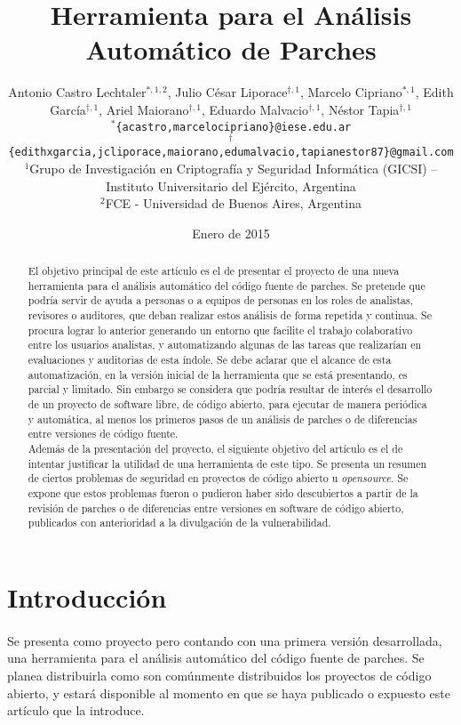 \documentclass[11pt,a4paper]{article}
\title{Herramienta para el Análisis\\Automático de Parches}
\author{
	Antonio Castro Lechtaler$^{\ast,1,2}$, Julio César Liporace$^{\dagger,1}$, Marcelo Cipriano$^{\ast,1}$, Edith García$^{\dagger,1}$, Ariel Maiorano$^{\dagger,1}$, Eduardo Malvacio$^{\dagger,1}$, Néstor Tapia$^{\dagger,1}$
	\\
	\vspace{2mm}
	\texttt{$^{\ast}$\{acastro,marcelocipriano\}@iese.edu.ar}
	\\
	\texttt{$^{\dagger}$\{edithxgarcia,jcliporace,maiorano,edumalvacio,tapianestor87\}@gmail.com}
	\\
	\vspace{5mm}
	$^1$Grupo de Investigación en Criptografía y Seguridad Informática (GICSI) – Instituto Universitario del Ejército, Argentina
	\\
	$^2$FCE - Universidad de Buenos Aires, Argentina
}
\date{Enero de 2015}
\begin{document}
\maketitle

\begin{abstract}
El objetivo principal de este artículo es el de presentar el proyecto de una nueva herramienta para el análisis automático del código fuente de parches. Se pretende que podría servir de ayuda a personas o a equipos de personas en los roles de analistas, revisores o auditores, que deban realizar estos análisis de forma repetida y continua. Se procura lograr lo anterior generando un entorno que facilite el trabajo colaborativo entre los usuarios analistas, y automatizando algunas de las tareas que realizarían en evaluaciones y auditorias de esta índole. Se debe aclarar que el alcance de esta automatización, en la versión inicial de la herramienta que se está presentando, es parcial y limitado. Sin embargo se considera que podría resultar de interés el desarrollo de un proyecto de software libre, de código abierto, para ejecutar de manera periódica y automática, al menos los primeros pasos de un análisis de parches o de diferencias entre versiones de código fuente.
\\
Además de la presentación del proyecto, el siguiente objetivo del artículo es el de intentar justificar la utilidad de una herramienta de este tipo. Se presenta un resumen de ciertos problemas de seguridad en proyectos de código abierto u \textit{opensource}. Se expone que estos problemas fueron o pudieron haber sido descubiertos a partir de la revisión de parches o de diferencias entre versiones en software de código abierto, publicados con anterioridad a la divulgación de la vulnerabilidad.
\end{abstract}

\newpage

\section{Introducción}

\paragraph{}Se presenta como proyecto pero contando con una primera versión desarrollada, una herramienta para el análisis automático del código fuente de parches. Se planea distribuirla como son comúnmente distribuidos los proyectos de código abierto, y estará disponible al momento en que se haya publicado o expuesto este artículo que la introduce.
\\
\end{document}
